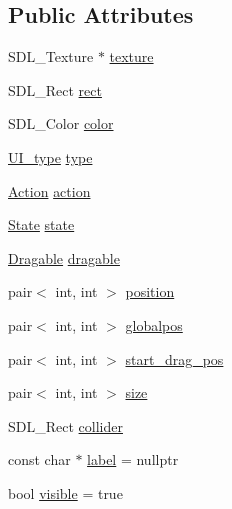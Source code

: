 \subsection*{Public Attributes}
\begin{DoxyCompactItemize}
\item 
S\+D\+L\+\_\+\+Texture $\ast$ \mbox{\hyperlink{class_u_i___element_a3247f386f99b334223a67a7000d821fb}{texture}}
\item 
S\+D\+L\+\_\+\+Rect \mbox{\hyperlink{class_u_i___element_a2dba8ecd63b5095e8dd9d4d53fd98b32}{rect}}
\item 
S\+D\+L\+\_\+\+Color \mbox{\hyperlink{class_u_i___element_acc8601d91ea8749d14bf8b03c1a18f6e}{color}}
\item 
\mbox{\hyperlink{class_u_i___element_a7ed595c46c75d53d30fa3813b036cf1e}{U\+I\+\_\+type}} \mbox{\hyperlink{class_u_i___element_ad40069673afbc9b0fbd596ef164e8e92}{type}}
\item 
\mbox{\hyperlink{class_u_i___element_ae179047d98a379f4e0dcdf0871c7b8d6}{Action}} \mbox{\hyperlink{class_u_i___element_a1d416dd216b21b0cfd8e234edad2b472}{action}}
\item 
\mbox{\hyperlink{class_u_i___element_a9c8a61f72c40984cccdb54325f9dc61a}{State}} \mbox{\hyperlink{class_u_i___element_a8ddf6ebdd05ecb2f5ad174c29064b604}{state}}
\item 
\mbox{\hyperlink{struct_dragable}{Dragable}} \mbox{\hyperlink{class_u_i___element_ac2b4266648ab33c1a486bfa8fd79d474}{dragable}}
\item 
pair$<$ int, int $>$ \mbox{\hyperlink{class_u_i___element_a47f8f59e3f076f611948eb7aee09d943}{position}}
\item 
pair$<$ int, int $>$ \mbox{\hyperlink{class_u_i___element_abb7953fd50dc002b8bec9d85db0b6ade}{globalpos}}
\item 
pair$<$ int, int $>$ \mbox{\hyperlink{class_u_i___element_aac94828dd8f149e69391b89b384d15b7}{start\+\_\+drag\+\_\+pos}}
\item 
pair$<$ int, int $>$ \mbox{\hyperlink{class_u_i___element_a6a5d2f29f12914f3806a82c4834746e6}{size}}
\item 
S\+D\+L\+\_\+\+Rect \mbox{\hyperlink{class_u_i___element_ab6dbc2e018fde1df8970ecb18e4dc366}{collider}}
\item 
const char $\ast$ \mbox{\hyperlink{class_u_i___element_ad7c19958ef5519d577f543676235bf93}{label}} = nullptr
\item 
bool \mbox{\hyperlink{class_u_i___element_a78aac2800a8d8db3ab76caddf3ece0c4}{visible}} = true
\item 

\end{DoxyCompactItemize}
